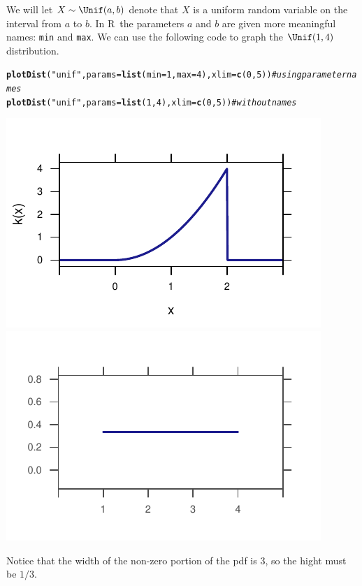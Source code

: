 \documentclass[twoside]{book}\usepackage[]{graphicx}\usepackage[]{xcolor}
\makeatletter
\def\maxwidth{ %
  \ifdim\Gin@nat@width>\linewidth
    \linewidth
  \else
    \Gin@nat@width
  \fi
}
\newcommand{\hlnum}[1]{\textcolor[rgb]{0.686,0.059,0.569}{#1}}%
\newcommand{\hlstr}[1]{\textcolor[rgb]{0.192,0.494,0.8}{#1}}%
\newcommand{\hlcom}[1]{\textcolor[rgb]{0.678,0.584,0.686}{\textit{#1}}}%
\newcommand{\hlstd}[1]{\textcolor[rgb]{0.345,0.345,0.345}{#1}}%
\newcommand{\hlkwc}[1]{\textcolor[rgb]{0.333,0.667,0.333}{#1}}%
\newcommand{\hlkwd}[1]{\textcolor[rgb]{0.737,0.353,0.396}{\textbf{#1}}}%
\newenvironment{kframe}{%
 \def\at@end@of@kframe{}%
 \ifinner\ifhmode%
  \def\at@end@of@kframe{\end{minipage}}%
  \begin{minipage}{\columnwidth}%
 \fi\fi%
 \def\FrameCommand##1{\hskip\@totalleftmargin \hskip-\fboxsep
 \colorbox{shadecolor}{##1}\hskip-\fboxsep
     \hskip-\linewidth \hskip-\@totalleftmargin \hskip\columnwidth}%
 \MakeFramed {\advance\hsize-\width
   \@totalleftmargin\z@ \linewidth\hsize
   \@setminipage}}%
 {\par\unskip\endMakeFramed%
 \at@end@of@kframe}
\newenvironment{knitrout}{}{} %
\renewcommand{\code}[1]{{\color{blue!80!black}\texttt{#1}}}
\def\R{{\sf R}}
\makeatother
\begin{document}
We will let $X \sim \Unif(a,b)$ denote that $X$ is a uniform random variable on 
the interval from $a$ to $b$.  
In \R\, the parameters $a$ and $b$ are given more meaningful names: \code{min} and \code{max}.
We can use the following code to graph the $\Unif(1,4)$ distribution.

\begin{knitrout}
\color{fgcolor}\begin{kframe}
\begin{alltt}
\hlkwd{plotDist}\hlstd{(}\hlstr{"unif"}\hlstd{,} \hlkwc{params} \hlstd{=} \hlkwd{list}\hlstd{(}\hlkwc{min} \hlstd{=} \hlnum{1}\hlstd{,} \hlkwc{max} \hlstd{=} \hlnum{4}\hlstd{),} \hlkwc{xlim} \hlstd{=} \hlkwd{c}\hlstd{(}\hlnum{0}\hlstd{,} \hlnum{5}\hlstd{))}  \hlcom{# using parameter names}
\hlkwd{plotDist}\hlstd{(}\hlstr{"unif"}\hlstd{,} \hlkwc{params} \hlstd{=} \hlkwd{list}\hlstd{(}\hlnum{1}\hlstd{,} \hlnum{4}\hlstd{),} \hlkwc{xlim} \hlstd{=} \hlkwd{c}\hlstd{(}\hlnum{0}\hlstd{,} \hlnum{5}\hlstd{))}  \hlcom{# without names}
\end{alltt}
\end{kframe}

{\centering \includegraphics[width=\maxwidth]{figures/fig-unnamed-chunk-68-1} 
\includegraphics[width=\maxwidth]{figures/fig-unnamed-chunk-68-2} 

}



\end{knitrout}
Notice that the width of the non-zero portion of the pdf is 3, so the hight must be $1/3$.
\end{document}
